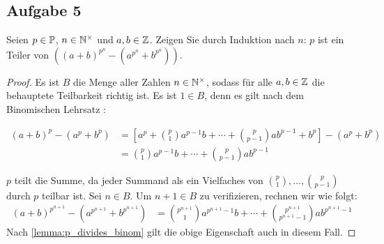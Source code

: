 \subsection{Aufgabe 5}
Seien $p \in \mathbb{P}{}$, $n \in \mathbb{N}^\times{}$ und $a,b \in \mathbb{Z}{}$. Zeigen Sie durch Induktion
nach $n$: $p$ ist ein Teiler von
$((a + b)^{p^n} - (a^{p^n} + b^{p^n}))$.
\begin{proof}
  Es ist $B$ die Menge aller Zahlen $n \in \mathbb{N}^\times{}$,
  sodass für alle $a,b \in \mathbb{Z}{}$ die behauptete Teilbarkeit richtig ist.
  Es ist $1 \in B$, denn es gilt nach dem Binomischen Lehrsatz
  \parencite[19]{book:zahlentheorie}:
  \begin{widemath}
    \begin{equation*}
      \begin{aligned}
        (a + b)^p - (a^p + b^p) & =
        \left[a^p + \binom{p}{1}a^{p-1}b + \dotsb + \binom{p}{p - 1}ab^{p-1} + b^p\right] - (a^p + b^p) \\
                                & = \binom{p}{1}a^{p-1}b + \dotsb + \binom{p}{p - 1}ab^{p-1}
      \end{aligned}
    \end{equation*}
  \end{widemath}
  $p$ teilt die Summe, da jeder Summand als ein Vielfaches
  von $\binom{p}{1},\dotsc,\binom{p}{p - 1}$ durch $p$ teilbar ist.
  Sei $n \in B$. Um $n + 1 \in B$ zu verifizieren, rechnen wir wie folgt:
  \begin{equation*}
    \begin{aligned}
      (a + b)^{p^{n+1}} - (a^{p^{n+1}} + b^{p^{n+1}}) & =
      \binom{p^{n+1}}{1}a^{p^{n+1}-1}b + \dotsb + \binom{p^{n+1}}{p^{n+1} - 1}ab^{p^{n+1}-1}
    \end{aligned}
  \end{equation*}
  Nach \autoref{lemma:p_divides_binom} gilt die obige Eigenschaft auch in diesem Fall.
\end{proof}

